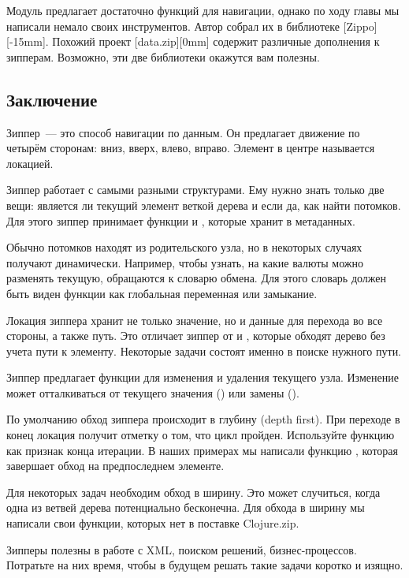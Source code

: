 Модуль  предлагает достаточно функций для навигации, однако по
ходу главы мы написали немало своих инструментов. Автор собрал их в библиотеке
[Zippo][-15mm]. Похожий проект
[data.zip][0mm] содержит различные дополнения к
зипперам. Возможно, эти две библиотеки окажутся вам полезны.

\subsection{Заключение}

Зиппер~--- это способ навигации по данным. Он предлагает движение по четырём
сторонам: вниз, вверх, влево, вправо. Элемент в центре называется локацией.

Зиппер работает с самыми разными структурами. Ему нужно знать только две вещи:
является ли текущий элемент веткой дерева и если да, как найти потомков. Для
этого зиппер принимает функции  и , которые хранит в
метаданных.

Обычно потомков находят из родительского узла, но в некоторых случаях получают
динамически. Например, чтобы узнать, на какие валюты можно разменять текущую,
обращаются к словарю обмена. Для этого словарь должен быть виден функции
 как глобальная переменная или замыкание.

Локация зиппера хранит не только значение, но и данные для перехода во все
стороны, а также путь. Это отличает зиппер от  и ,
которые обходят дерево без учета пути к элементу. Некоторые задачи состоят
именно в поиске нужного пути.

Зиппер предлагает функции для изменения и удаления текущего узла. Изменение
может отталкиваться от текущего значения () или замены
().

По умолчанию обход зиппера происходит в глубину (depth first). При переходе в
конец локация получит отметку о том, что цикл пройден. Используйте функцию
 как признак конца итерации. В наших примерах мы написали функцию
, которая завершает обход на предпоследнем элементе.

Для некоторых задач необходим обход в ширину. Это может случиться, когда одна из
ветвей дерева потенциально бесконечна. Для обхода в ширину мы написали свои
функции, которых нет в поставке Clojure.zip.

Зипперы полезны в работе с XML, поиском решений, бизнес-процессов. Потратьте на
них время, чтобы в будущем решать такие задачи коротко и изящно.
